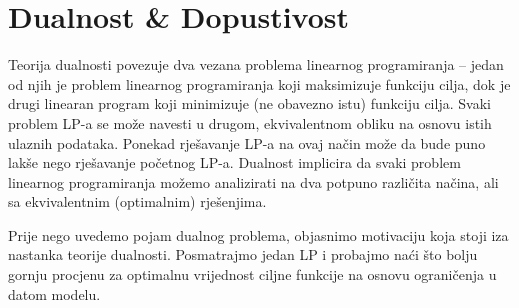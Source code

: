 \documentclass[a4paper, utf8, 11pt, colorlinks]{book}
\begin{document}

  \newpage
 \chapter{Dualnost \& Dopustivost}
 
 Teorija dualnosti povezuje dva vezana problema linearnog programiranja -- jedan od njih je problem linearnog programiranja koji maksimizuje funkciju cilja, dok je drugi linearan program  koji minimizuje (ne obavezno istu) funkciju cilja. Svaki problem LP-a se može navesti u drugom, ekvivalentnom obliku na osnovu istih ulaznih podataka. Ponekad rješavanje LP-a na ovaj način može da bude puno lakše nego rješavanje početnog LP-a.  Dualnost implicira da svaki problem linearnog programiranja možemo analizirati na dva potpuno različita načina, ali sa ekvivalentnim (optimalnim) rješenjima. 
 
 
 
 Prije nego uvedemo pojam dualnog problema, objasnimo motivaciju koja stoji iza nastanka teorije dualnosti. Posmatrajmo jedan LP i probajmo naći što bolju gornju procjenu za optimalnu vrijednost ciljne funkcije na osnovu ograničenja u datom modelu.
 
\end{document}
